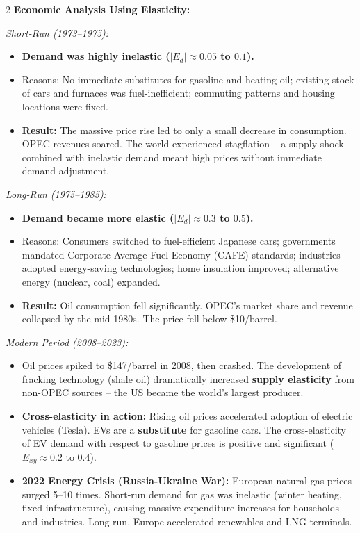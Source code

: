 \documentclass[10pt,a4paper]{article}
\begin{document}
\begin{multicols}{2}
\textbf{Economic Analysis Using Elasticity:}

\textit{Short-Run (1973--1975):}
\begin{itemize}[leftmargin=*,nosep]
    \item \textbf{Demand was highly inelastic ($|E_d| \approx 0.05$ to $0.1$).}
    \item Reasons: No immediate substitutes for gasoline and heating oil; existing stock of cars and furnaces was fuel-inefficient; commuting patterns and housing locations were fixed.
    \item \textbf{Result:} The massive price rise led to only a small decrease in consumption. OPEC revenues soared. The world experienced stagflation -- a supply shock combined with inelastic demand meant high prices without immediate demand adjustment.
\end{itemize}

\textit{Long-Run (1975--1985):}
\begin{itemize}[leftmargin=*,nosep]
    \item \textbf{Demand became more elastic ($|E_d| \approx 0.3$ to $0.5$).}
    \item Reasons: Consumers switched to fuel-efficient Japanese cars; governments mandated Corporate Average Fuel Economy (CAFE) standards; industries adopted energy-saving technologies; home insulation improved; alternative energy (nuclear, coal) expanded.
    \item \textbf{Result:} Oil consumption fell significantly. OPEC's market share and revenue collapsed by the mid-1980s. The price fell below \$10/barrel.
\end{itemize}

\textit{Modern Period (2008--2023):}
\begin{itemize}[leftmargin=*,nosep]
    \item Oil prices spiked to \$147/barrel in 2008, then crashed. The development of fracking technology (shale oil) dramatically increased \textbf{supply elasticity} from non-OPEC sources -- the US became the world's largest producer.
    \item \textbf{Cross-elasticity in action:} Rising oil prices accelerated adoption of electric vehicles (Tesla). EVs are a \textbf{substitute} for gasoline cars. The cross-elasticity of EV demand with respect to gasoline prices is positive and significant ($E_{xy} \approx 0.2$ to $0.4$).
    \item \textbf{2022 Energy Crisis (Russia-Ukraine War):} European natural gas prices surged 5--10 times. Short-run demand for gas was inelastic (winter heating, fixed infrastructure), causing massive expenditure increases for households and industries. Long-run, Europe accelerated renewables and LNG terminals.
\end{itemize}


\end{multicols}
\end{document}
